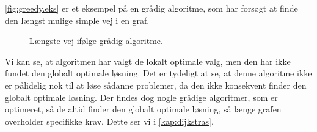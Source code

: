 \autoref{fig:greedy.eks} er et eksempel på en grådig algoritme, som har forsøgt at finde den længst mulige simple vej i en graf.

\begin{figure}[H]
\centering
	\caption{Længste vej ifølge grådig algoritme.}
	\label{fig:greedy.eks}
\end{figure}

Vi kan se, at algoritmen har valgt de lokalt optimale valg, men den har ikke fundet den globalt optimale løsning. Det er tydeligt at se, at denne algoritme ikke er pålidelig nok til at løse sådanne problemer, da den ikke konsekvent finder den globalt optimale løsning. Der findes dog nogle grådige algoritmer, som er optimeret, så de altid finder den globalt optimale løsning, så længe grafen overholder specifikke krav. Dette ser vi i \autoref{kap:dijkstras}.

